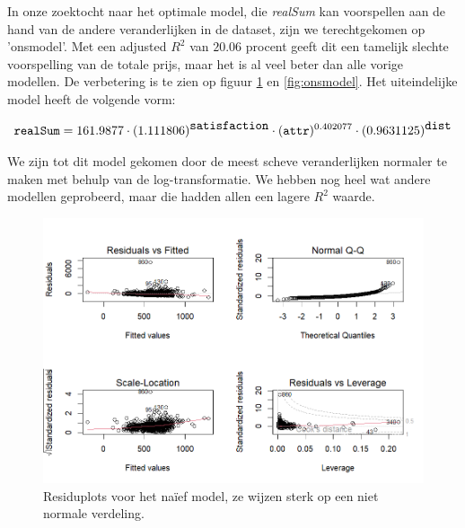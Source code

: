 \documentclass[a4paper]{kulakarticle}
\begin{document}
	In onze zoektocht naar het optimale model, die \textit{realSum} kan voorspellen aan de hand van de andere veranderlijken in de dataset, zijn we terechtgekomen op 'onsmodel'. Met een adjusted $R^2$ van $20.06$ procent geeft dit een tamelijk slechte voorspelling van de totale prijs, maar het is al veel beter dan alle vorige modellen. De verbetering is te zien op figuur \ref{fig:naiefmodel} en \ref{fig:onsmodel}. Het uiteindelijke model heeft de volgende vorm:
	
	\begin{equation}
		\verb*|realSum| = 161.9877 \cdot (1.111806)^{ \verb*|satisfaction|} \cdot  (\verb*|attr|)^{0.402077} \cdot (0.9631125)^{ \verb*|dist|}
	\end{equation}%
	
	We zijn tot dit model gekomen door de meest scheve veranderlijken normaler te maken met behulp van de log-transformatie. We hebben nog heel wat andere modellen geprobeerd, maar die hadden allen een lagere $R^2$ waarde. 
 
	\begin{figure}
		\centering
		\includegraphics[width=0.9\linewidth]{Figuren/naiefmodel}
		\caption{Residuplots voor het naïef model, ze wijzen sterk op een niet normale verdeling.}
		\label{fig:naiefmodel}
	\end{figure}
	
	
	
\end{document}

